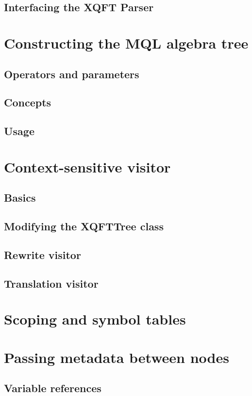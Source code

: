 \subsection{Interfacing the XQFT Parser}

\section{Constructing the MQL algebra tree}
\subsection{Operators and parameters}
\subsection{Concepts}
\subsection{Usage}

\section{Context-sensitive visitor}
\subsection{Basics}
\subsection{Modifying the XQFTTree class}
\subsection{Rewrite visitor}
\subsection{Translation visitor}

\section{Scoping and symbol tables}

\section{Passing metadata between nodes}
\subsection{Variable references}
